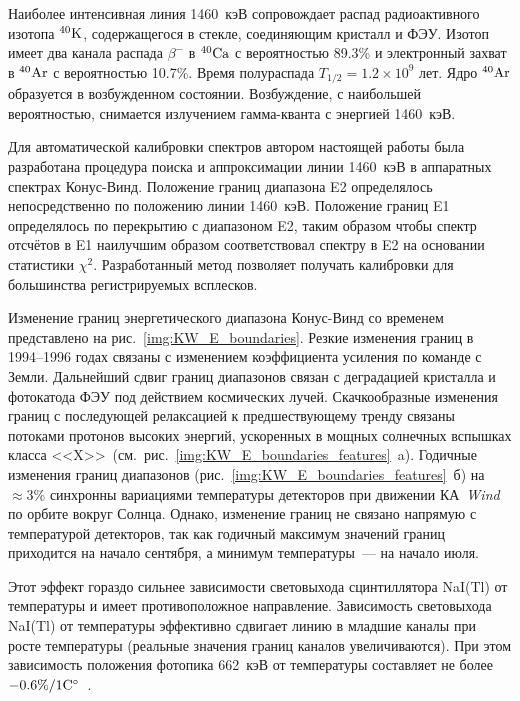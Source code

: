 Наиболее интенсивная линия 1460~кэВ сопровождает распад радиоактивного 
изотопа $^{40}{\mathrm{K}}$, содержащегося в стекле, соединяющим кристалл и ФЭУ. 
Изотоп имеет два канала распада $\beta^{-}$ в $^{40}{\mathrm{Ca}}$ с 
вероятностью 89.3\% и электронный захват в $^{40}{\mathrm{Ar}}$ с вероятностью 10.7\%. 
Время полураспада $T_{1/2}=1.2\times10^9$ лет. Ядро $^{40}{\mathrm{Ar}}$ образуется в
возбужденном состоянии. Возбуждение, с наибольшей вероятностью, снимается 
излучением гамма-кванта с энергией 1460~кэВ.

Для автоматической калибровки спектров автором настоящей работы была 
разработана процедура поиска и аппроксимации линии 1460~кэВ в аппаратных спектрах 
Конус-Винд. Положение границ диапазона E2 определялось непосредственно по положению 
линии 1460~кэВ. Положение границ E1 определялось по перекрытию с диапазоном E2, 
таким образом чтобы спектр отсчётов в E1 наилучшим образом соответствовал спектру в E2 
на основании статистики $\chi^2$. Разработанный метод позволяет получать калибровки 
для большинства регистрируемых всплесков.

Изменение границ энергетического диапазона Конус-Винд со временем представлено 
на рис.~\ref{img:KW_E_boundaries}. Резкие изменения границ в 1994--1996 годах 
связаны с изменением коэффициента усиления по команде с Земли. Дальнейший сдвиг 
границ диапазонов связан с деградацией кристалла и фотокатода ФЭУ под действием 
космических лучей. Скачкообразные изменения границ с последующей релаксацией 
к предшествующему тренду связаны потоками протонов высоких энергий, ускоренных в мощных 
солнечных вспышках класса <<X>>\ (см.~рис.~\ref{img:KW_E_boundaries_features}~a). 
Годичные изменения границ диапазонов (рис.~\ref{img:KW_E_boundaries_features}~б) 
на $\approx 3$\% синхронны вариациями температуры детекторов при движении 
КА~\textit{Wind} по орбите вокруг Солнца. Однако, изменение границ не связано напрямую 
с температурой детекторов, так как годичный максимум значений границ приходится на 
начало сентября, а минимум температуры~--- на начало июля. 

Этот эффект гораздо сильнее зависимости световыхода сцинтиллятора NaI(Tl) 
от температуры и имеет противоположное направление. Зависимость световыхода NaI(Tl) от 
температуры эффективно сдвигает линию в младшие каналы при росте температуры 
(реальные значения границ каналов увеличиваются). При этом зависимость положения 
фотопика 662~кэВ от температуры составляет не более~$-0.6\textrm{\%}/1 {\mathrm{C}}^{\circ}$~\citep{Ianakiev_2009NIMP}.


